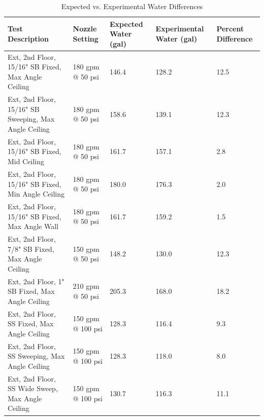 \documentclass[12pt,oneside]{book}
\begin{document}
\begin{table}[!ht]
\tiny
\centering
\caption{Expected vs. Experimental Water Differences}
\label{Expected_vs._Experimental_Water_Differences}
\begin{tabular}{lllll}
\toprule[1.5pt]
Test Description                                      & Nozzle Setting                 & Expected Water (gal)              & Experimental Water (gal)           & Percent Difference     \\
\midrule
Ext, 2nd Floor, 15/16" SB Fixed, Max Angle Ceiling    & 180 gpm @ 50 psi               & 146.4                             & 128.2                              & 12.5                   \\
Ext, 2nd Floor, 15/16" SB Sweeping, Max Angle Ceiling & 180 gpm @ 50 psi               & 158.6                             & 139.1                              & 12.3                   \\
Ext, 2nd Floor, 15/16" SB Fixed, Mid Ceiling          & 180 gpm @ 50 psi               & 161.7                             & 157.1                              & 2.8                    \\
Ext, 2nd Floor, 15/16" SB Fixed, Min Angle Ceiling    & 180 gpm @ 50 psi               & 180.0                             & 176.3                              & 2.0                    \\
Ext, 2nd Floor, 15/16" SB Fixed, Max Angle Wall       & 180 gpm @ 50 psi               & 161.7                             & 159.2                              & 1.5                    \\
Ext, 2nd Floor, 7/8" SB Fixed, Max Angle Ceiling      & 150 gpm @ 50 psi               & 148.2                             & 130.0                              & 12.3                   \\
Ext, 2nd Floor, 1" SB Fixed, Max Angle Ceiling        & 210 gpm @ 50 psi               & 205.3                             & 168.0                              & 18.2                   \\
Ext, 2nd Floor, SS Fixed, Max Angle Ceiling           & 150 gpm @ 100 psi              & 128.3                             & 116.4                              & 9.3                    \\
Ext, 2nd Floor, SS Sweeping, Max Angle Ceiling        & 150 gpm @ 100 psi              & 128.3                             & 118.0                              & 8.0                    \\
Ext, 2nd Floor, SS Wide Sweep, Max Angle Ceiling      & 150 gpm @ 100 psi              & 130.7                             & 116.3                              & 11.1                   \\

\end{tabular}
\end{table}
\end{document}
